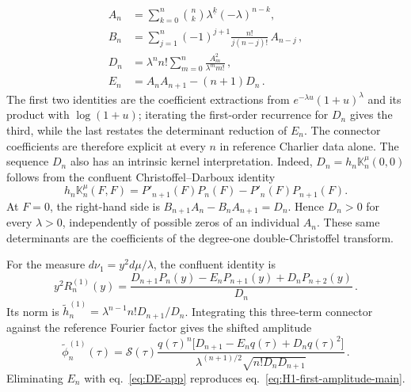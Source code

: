 \documentclass[a4paper,11pt]{article}
\def\dd{d}%
\def\ee{e}%
\theoremstyle{definition}
\theoremstyle{remark}
\newcommand{\dd}{\mathrm d}
\newcommand{\ee}{\mathrm e}
\newcommand{\tphi}{\widetilde\phi}
\newcommand{\thh}{\widetilde h}
\newcommand{\cS}{\mathcal S}
\begin{document}
\begin{equation}
\begin{aligned}
   A_n&=\sum_{k=0}^{n}\binom{n}{k}\lambda^{\underline{k}}(-\lambda)^{n-k},\\
   B_n&=\sum_{j=1}^{n}(-1)^{j+1}\frac{n!}{j(n-j)!}\,A_{n-j}\,,\\
   D_n&=\lambda^n n!\sum_{m=0}^{n}\frac{A_m^2}{\lambda^m m!}\,,\\
   E_n&=A_nA_{n+1}-(n+1)D_n\,.
\end{aligned}
   \label{eq:ABDE-closed-app}
\end{equation}
The first two identities are the coefficient extractions from $\ee^{-\lambda u}(1+u)^\lambda$ and its product with $\log(1+u)$; iterating the first-order recurrence for $D_n$ gives the third, while the last restates the determinant reduction of $E_n$. The connector coefficients are therefore explicit at every $n$ in reference Charlier data alone. The sequence $D_n$ also has an intrinsic kernel interpretation. Indeed, $D_n=h_n \mathbb K_n^{\mu}(0,0)$ follows from the confluent Christoffel--Darboux identity
\begin{equation}
   h_n \mathbb K_n^\mu(F,F)=P'_{n+1}(F)P_n(F)-P'_n(F)P_{n+1}(F).
   \label{eq:Dn-kernel-proof-app}
\end{equation}
At $F=0$, the right-hand side is $B_{n+1}A_n-B_nA_{n+1}=D_n$. Hence $D_n>0$ for every $\lambda>0$, independently of possible zeros of an individual $A_n$. These same determinants are the coefficients of the degree-one double-Christoffel transform.

For the measure $\dd\nu_1=y^2\dd\mu/\lambda$, the confluent identity is
\begin{equation}
   y^2R_n^{(1)}(y)=
   \frac{D_{n+1}P_n(y)-E_nP_{n+1}(y)+D_nP_{n+2}(y)}{D_n}\,.
   \label{eq:H1-app-poly}
\end{equation}
Its norm is $\thh_n^{(1)}=\lambda^{n-1}n!D_{n+1}/D_n$. Integrating this three-term connector against the reference Fourier factor gives the shifted amplitude
\begin{equation}
   \tphi_n^{(1)}(\tau)=\cS(\tau)
   \frac{q(\tau)^n\bigl[D_{n+1}-E_nq(\tau)+D_nq(\tau)^2\bigr]}{\lambda^{(n+1)/2}\sqrt{n!D_nD_{n+1}}}\,.
   \label{eq:H1-app-amplitude}
\end{equation}
Eliminating $E_n$ with eq.~\eqref{eq:DE-app} reproduces eq.~\eqref{eq:H1-first-amplitude-main}.
\end{document}
